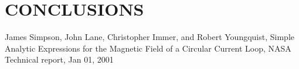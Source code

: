 \documentclass[letterpaper, 10 pt, conference]{ieeeconf}  %
\begin{document}
   



\section{CONCLUSIONS}


\addtolength{\textheight}{-12cm}   %








\begin{thebibliography}{99}

 James Simpson, John Lane, Christopher Immer, and Robert Youngquist, Simple Analytic Expressions for the Magnetic 
Field of a Circular Current Loop, NASA Technical report, Jan 01, 2001







\end{thebibliography}
\end{document}

